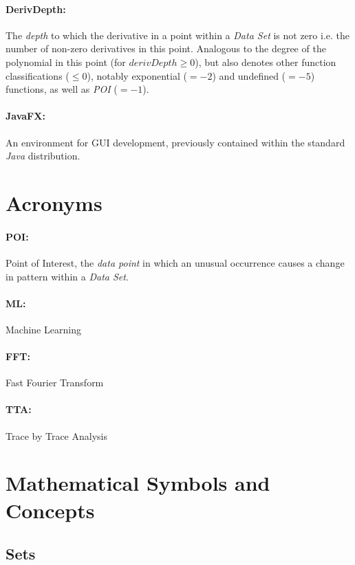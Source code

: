 \documentclass[main.tex]{subfiles}
\begin{document}
    \paragraph{DerivDepth:} The \textit{depth} to which the derivative in a point within a \textit{Data Set} is not zero i.e. the number of non-zero derivatives in this point. Analogous to the degree of the polynomial in this point (for $derivDepth \geq 0$), but also denotes other function classifications ($\leq 0$), notably exponential ($=-2$) and undefined ($=-5$) functions, as well as \textit{POI} ($=-1$).
    
    \paragraph{JavaFX:} An environment for GUI development, previously contained within the standard \textit{Java} distribution.
  
  \section{Acronyms}
     
    \paragraph{POI:} Point of Interest, the \textit{data point} in which an unusual occurrence causes a change in pattern within a \textit{Data Set}.
    
    \paragraph{ML:} Machine Learning
    
    \paragraph{FFT:} Fast Fourier Transform
    
    \paragraph{TTA:} Trace by Trace Analysis
  
  \section{Mathematical Symbols and Concepts}
  
    \subsection{Sets}
    
\end{document}
